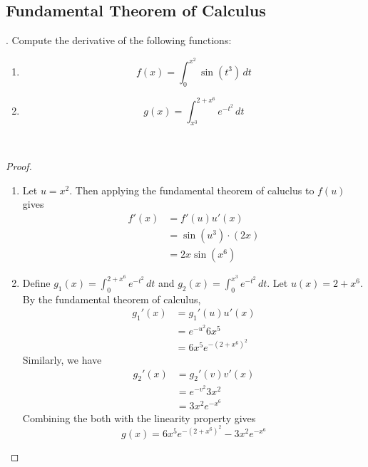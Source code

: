 \documentclass[a4paper]{article}
\begin{document}
\subsection{Fundamental Theorem of Calculus}
\begin{qtn}{}{}
\thetcbcounter.\;\; Compute the derivative of the following functions: 
\begin{enumerate}[label=\alph*)]
\item $$f(x)=\int_0^{x^2}\sin(t^3)\,dt$$
\item $$g(x)=\int_{x^3}^{2+x^6}e^{-t^2}\,dt$$
\end{enumerate}~\\\hspace*{\fill}\cite{R0002}\tcbline
\begin{proof}~\\
\begin{enumerate}[label=\alph*)]
\item Let $u=x^2$. Then applying the fundamental theorem of caluclus to $f(u)$ gives 
\begin{align*}
f'(x)&=f'(u)u'(x)\tag{Chain Rule}\\
&=\sin(u^3)\cdot(2x)\\
&=2x\sin(x^6)
\end{align*}
\item Define $g_1(x)=\int_{0}^{2+x^6}e^{-t^2}\,dt$ and $g_2(x)=\int_0^{x^3}e^{-t^2}\,dt$. Let $u(x)=2+x^6$. By the fundamental theorem of calculus, 
\begin{align*}
g_1'(x)&=g_1'(u)u'(x)\tag{Chain Rule}\\
&=e^{-u^2}6x^5\\
&=6x^5e^{-(2+x^6)^2}
\end{align*}
Similarly, we have
\begin{align*}
g_2'(x)&=g_2'(v)v'(x)\tag{$v(x)=x^3$}\\
&=e^{-v^2}3x^2\\
&=3x^2e^{-x^6}
\end{align*}
Combining the both with the linearity property gives $$g(x)=6x^5e^{-(2+x^6)^2}-3x^2e^{-x^6}$$
\end{enumerate}
\end{proof}
\end{qtn}
\end{document}
